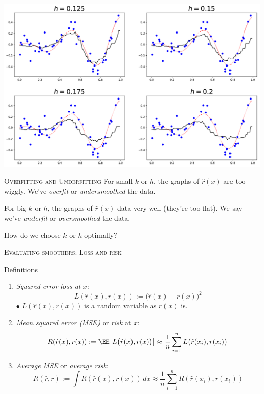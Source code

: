 \documentclass{beamer}
\begin{document}
\begin{frame}{}%
    \includegraphics[scale=0.36]{la_four_plots_2.pdf}
\end{frame}

\begin{frame}{\textsc{Overfitting and Underfitting}}
    For small $k$ or $h$, the graphs of $\hat r(x)$ are too wiggly.
    We've \emph{overfit} or \emph{undersmoothed} the data.

    For big $k$ or $h$, the graphs of $\hat{r}(x)$ data very well (they're too flat).
    We say we've \emph{underfit} or \emph{oversmoothed} the data.

    How do we choose $k$ or $h$ optimally?
\end{frame}


\begin{frame}{\textsc{Evaluating smoothers: Loss and risk}}

    \begin{block}{Definitions}
        \begin{enumerate}\setlength\itemsep{1em}
            \item \emph{Squared error loss  at $x$:}
            \[
            L(\hat r(x), r(x)) := \big(\hat r(x) - r(x)\big)^2
        \]
        $\bullet$ $L(\hat r(x), r(x))$ is a random variable as $\hat r(x)$ is.

        \item \emph{Mean squared error (MSE)}  or \emph{risk} at $x$:
        \[
            R(\hat r(x), r(x)) := \EE\big[L\big(\hat r(x), r(x)\big)\big] 
            \approx \frac1n\sum_{i=1}^n L\big(\hat r(x_i), r(x_i)\big)
        \]

        \item \emph{Average MSE} or \emph{average risk}:
        \[
            R(\hat r, r) := \int R(\hat r(x), r(x))\,dx
            \approx \frac1n\sum_{i=1}^n R(\hat r(x_i), r(x_i))
        \]
        \end{enumerate}
    \end{block}
\end{frame}
\end{document}
